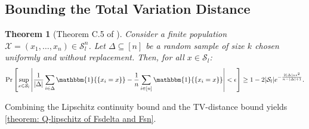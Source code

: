 \documentclass{article}
\theoremstyle{plain}
\newtheorem{theorem}{Theorem}[section]
\theoremstyle{definition}
\begin{document}
\subsection{Bounding the Total Variation Distance}


\begin{theorem}[Theorem C.5 of \citet{anand2024efficientreinforcementlearningglobal}]\label{theorem: sampling without replacement analog of DKW}
Consider a finite population $\mathcal{X}=(x_1,\dots,x_n)\in \mathcal{S}_l^n$. Let $\Delta\subseteq[n]$ be a random sample of size $k$ chosen uniformly and without replacement.  Then, for all $x\in\mathcal{S}_l$:
\[\Pr\left[\sup_{x\in\mathcal{S}_l}\left|\frac{1}{|\Delta|}\sum_{i\in\Delta}\mathbbm{1}{\{x_i = x\}} - \frac{1}{n}\sum_{i\in[n]}\mathbbm{1}{\{x_i = x\}}\right|<\epsilon\right] \geq 1 - 2|\mathcal{S}_l|e^{-\frac{2|\Delta|n\epsilon^2}{n-|\Delta|+1}}.\]
\end{theorem}

Combining the Lipschitz continuity bound  and the TV-distance bound yields \cref{theorem: Q-lipschitz of Fsdelta and Fsn}. \\
\end{document}
